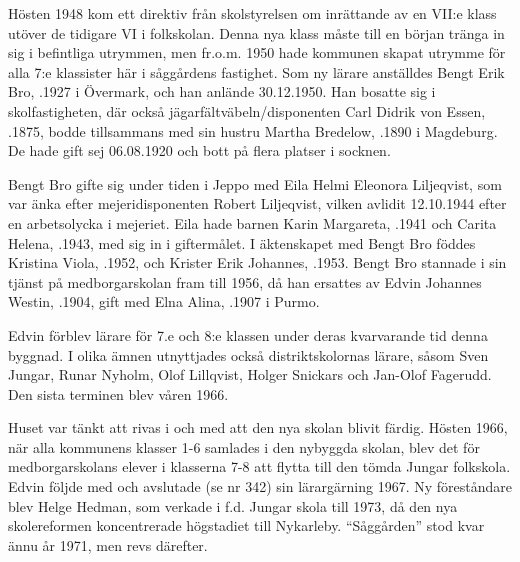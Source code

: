
Hösten 1948 kom ett direktiv från skolstyrelsen om inrättande av en VII:e klass utöver de tidigare VI i folkskolan. Denna nya klass måste till en början tränga in sig i befintliga utrymmen, men fr.o.m. 1950 hade kommunen skapat utrymme för alla 7:e klassister här i såggårdens fastighet. Som ny lärare anställdes Bengt Erik Bro, .1927 i Övermark, och han anlände 30.12.1950. Han bosatte sig i skolfastigheten, där också jägarfältväbeln/disponenten Carl Didrik von Essen, .1875, bodde tillsammans med sin hustru Martha Bredelow, .1890 i Magdeburg. De hade gift sej 06.08.1920 och bott på flera platser i socknen.

Bengt Bro gifte sig under tiden i Jeppo med Eila Helmi Eleonora Liljeqvist, som var änka efter mejeridisponenten Robert Liljeqvist, vilken avlidit 12.10.1944 efter en arbetsolycka i mejeriet. Eila hade barnen Karin Margareta, .1941 och Carita Helena, .1943, med sig in i giftermålet. I äktenskapet med Bengt Bro föddes Kristina Viola, .1952, och Krister Erik Johannes, .1953. Bengt Bro stannade i sin tjänst på medborgarskolan fram till 1956, då han ersattes av Edvin Johannes Westin, .1904, gift med Elna Alina, .1907 i Purmo.
\begin{jhchildren}
  \item {}
  \item {}
  \item {}
\end{jhchildren}

Edvin förblev lärare för 7.e och  8:e klassen under deras kvarvarande tid denna byggnad. I olika ämnen utnyttjades också distriktskolornas lärare, såsom Sven Jungar, Runar Nyholm, Olof Lillqvist, Holger Snickars och Jan-Olof Fagerudd. Den sista terminen blev våren 1966.

Huset var tänkt att rivas i och med att den nya skolan blivit färdig. Hösten 1966, när alla kommunens klasser 1-6 samlades i den nybyggda skolan, blev det för medborgarskolans elever i klasserna 7-8 att flytta till den tömda Jungar folkskola. Edvin följde med och avslutade (se nr 342) sin lärargärning 1967. Ny föreståndare blev Helge Hedman, som verkade i f.d. Jungar skola till 1973, då den nya skolereformen koncentrerade högstadiet till Nykarleby. ``Såggården'' stod kvar ännu år 1971, men revs därefter.



